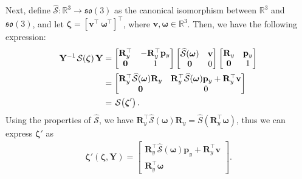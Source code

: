 Next, define $\widehat{\mathcal{S}}:\mathbb{R}^3\to\mathfrak{so}(3)$ as the canonical isomorphism between $\mathbb{R}^3$ and $\mathfrak{so}(3)$, and let $\boldsymbol{\zeta}=[\mathbf{v}^\top\ \boldsymbol{\omega}^\top]^\top$, where $\mathbf{v}, \boldsymbol{\omega}\in\mathbb{R}^3$. Then, we have the following expression:
\begin{align}
  \begin{split}
      \mathbf{Y}^{-1}\SL[\boldsymbol{\zeta}]\mathbf{Y} &= 
      \begin{bmatrix}
          \mathbf{R}_y^\top & -\mathbf{R}_y^\top\mathbf{p}_y\\
          \mathbf{0} & 1
      \end{bmatrix}
      \begin{bmatrix}
          \widehat{\mathcal{S}}(\boldsymbol{\omega}) & \mathbf{v}\\
          \mathbf{0} & 0
      \end{bmatrix}
      \begin{bmatrix}
          \mathbf{R}_y & \mathbf{p}_y\\
          \mathbf{0} & 1
      \end{bmatrix}\\
      &= 
      \begin{bmatrix}
          \mathbf{R}_y^\top\widehat{\mathcal{S}}(\boldsymbol{\omega})\mathbf{R}_y & \mathbf{R}_y^\top\widehat{\mathcal{S}}(\boldsymbol{\omega})\mathbf{p}_y + \mathbf{R}_y^\top\mathbf{v}\\
          \mathbf{0} & 0
      \end{bmatrix}\\
      &= \SL[\boldsymbol{\zeta}'].
  \end{split}
\end{align}
Using the properties of $\widehat{\mathcal{S}}$, we have $\mathbf{R}_y^\top\widehat{\mathcal{S}}(\boldsymbol{\omega})\mathbf{R}_y = \widehat{S}(\mathbf{R}_y^\top\boldsymbol{\omega})$, thus we can express $\boldsymbol{\zeta}'$ as
\begin{align}
    \boldsymbol{\zeta}'(\boldsymbol{\zeta}, \mathbf{Y}) = \begin{bmatrix}
        \mathbf{R}_y^\top\widehat{\mathcal{S}}(\boldsymbol{\omega})\mathbf{p}_y + \mathbf{R}_y^\top\mathbf{v}\\
        \mathbf{R}_y^\top\boldsymbol{\omega}
    \end{bmatrix}.
\end{align}

